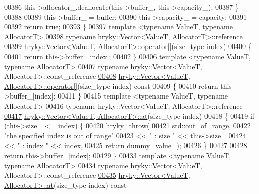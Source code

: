 \begin{DoxyCode}
00386         this->allocator\_.deallocate(this->buffer\_, this->capacity\_);
00387     \}
00388 
00389     this->buffer\_ = buffer;
00390     this->capacity\_ = capacity;
00391 
00392     \textcolor{keywordflow}{return} \textcolor{keyword}{true};
00393 \}
00397 \textcolor{keyword}{template} <\textcolor{keyword}{typename} ValueT, \textcolor{keyword}{typename} AllocatorT>
00398 \textcolor{keyword}{typename} hryky::Vector<ValueT, AllocatorT>::reference
\hypertarget{vector_8h_source_l00399}{}\hyperlink{classhryky_1_1_vector_a6fb915248cdb9b8ae21edd5379dd6777}{00399} \hyperlink{classhryky_1_1_vector}{hryky::Vector<ValueT, AllocatorT>::operator[]}(size\_type index)
00400 \{
00401     \textcolor{keywordflow}{return} this->buffer\_[index];
00402 \}
00406 \textcolor{keyword}{template} <\textcolor{keyword}{typename} ValueT, \textcolor{keyword}{typename} AllocatorT>
00407 \textcolor{keyword}{typename} hryky::Vector<ValueT, AllocatorT>::const\_reference
\hypertarget{vector_8h_source_l00408}{}\hyperlink{classhryky_1_1_vector_ad9a57bc485b9b2f17432715c920006b2}{00408} \hyperlink{classhryky_1_1_vector}{hryky::Vector<ValueT, AllocatorT>::operator[]}(size\_type index)\textcolor{keyword}{ const}
00409 \textcolor{keyword}{}\{
00410     \textcolor{keywordflow}{return} this->buffer\_[index];
00411 \}
00415 \textcolor{keyword}{template} <\textcolor{keyword}{typename} ValueT, \textcolor{keyword}{typename} AllocatorT>
00416 \textcolor{keyword}{typename} hryky::Vector<ValueT, AllocatorT>::reference
\hypertarget{vector_8h_source_l00417}{}\hyperlink{classhryky_1_1_vector_ae825547a4a63bd87f8e2f782d6932156}{00417} \hyperlink{classhryky_1_1_vector}{hryky::Vector<ValueT, AllocatorT>::at}(size\_type index)
00418 \{
00419     \textcolor{keywordflow}{if} (this->size\_ <= index) \{
00420         \hyperlink{debug__common_8h_af50606eac4009921527ddcaed392b2c2}{hryky_throw}(
00421             std::out\_of\_range,
00422             \textcolor{stringliteral}{"the specified index is out of range"}
00423             << \textcolor{stringliteral}{" : size "} << this->size\_
00424             << \textcolor{stringliteral}{" : index "} << index,
00425             \textcolor{keywordflow}{return} dummy\_value\_);
00426     \}
00427     
00428     \textcolor{keywordflow}{return} this->buffer\_[index];
00429 \}
00433 \textcolor{keyword}{template} <\textcolor{keyword}{typename} ValueT, \textcolor{keyword}{typename} AllocatorT>
00434 \textcolor{keyword}{typename} hryky::Vector<ValueT, AllocatorT>::const\_reference
\hypertarget{vector_8h_source_l00435}{}\hyperlink{classhryky_1_1_vector_a225bbcff00762d23e1978c51f9d25d68}{00435} \hyperlink{classhryky_1_1_vector}{hryky::Vector<ValueT, AllocatorT>::at}(size\_type index)\textcolor{keyword}{ const}

\end{DoxyCode}

